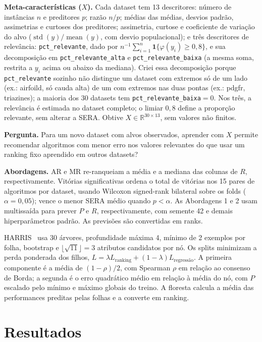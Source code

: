 \documentclass[10pt]{article}
\newcommand{\code}[1]{\texttt{\seqsplit{#1}}}
\begin{document}
\textbf{Meta-características ($X$).} Cada dataset tem 13 descritores:
número de instâncias $n$ e preditores $p$; razão $n/p$; médias das médias,
desvios padrão, assimetrias e curtoses dos preditores; assimetria, curtose
e coeficiente de variação do alvo
($\operatorname{std}(y)/\operatorname{mean}(y)$, com desvio populacional);
e três descritores de relevância: \texttt{pct\_relevante}, dado por
$n^{-1}\sum_{i=1}^{n}\mathbf{1}\{\varphi(y_i)\geq0{,}8\}$, e sua decomposição
em \texttt{pct\_relevante\_alta} e \texttt{pct\_relevante\_baixa} (a mesma
soma, restrita a $y_i$ acima ou abaixo da mediana). Criei essa decomposição
porque \texttt{pct\_relevante} sozinho não distingue um dataset com extremos
só de um lado (ex.: airfoild, só cauda alta) de um com extremos nas duas
pontas (ex.: pdgfr, triazines); a maioria dos 30 datasets tem
\texttt{pct\_relevante\_baixa}$=0$. Nos três, a relevância é estimada no
dataset completo; o limiar $0{,}8$ define a proporção relevante, sem alterar
a SERA. Obtive $X\in\mathbb{R}^{30\times13}$, sem valores não finitos.

\textbf{Pergunta.} Para um novo dataset com alvos observados, aprender com
$X$ permite recomendar algoritmos com menor erro nos valores relevantes
do que usar um ranking fixo aprendido em outros datasets?

\textbf{Abordagens.} AR e MR re-ranqueiam a média e a mediana das colunas
de $R$, respectivamente. Vitórias significativas ordena o total de vitórias
nos 15 pares de algoritmos por dataset, usando Wilcoxon signed-rank
bilateral sobre os folds ($\alpha=0{,}05$); vence o menor SERA médio quando
$p<\alpha$. As Abordagens 1 e 2 usam \code{RandomForestRegressor}
multissaída para prever $P$ e $R$, respectivamente, com semente 42 e demais
hiperparâmetros padrão. As previsões são convertidas em ranks.

HARRIS~\cite{harris} usa 30 árvores, profundidade máxima 4, mínimo de 2
exemplos por folha, bootstrap e $\lfloor\sqrt{11}\rfloor=3$ atributos
candidatos por nó. Os splits minimizam a perda ponderada dos filhos,
$L=\lambda L_{\mathrm{ranking}}+(1-\lambda)L_{\text{regressão}}$.
A primeira componente é a média de $(1-\rho)/2$, com Spearman $\rho$
em relação ao consenso de Borda; a segunda é o erro quadrático médio
em relação à média do nó, com $P$ escalado pelo mínimo e máximo globais
do treino. A floresta calcula a média das performances preditas pelas
folhas e a converte em ranking.

\section{Resultados}
\end{document}
